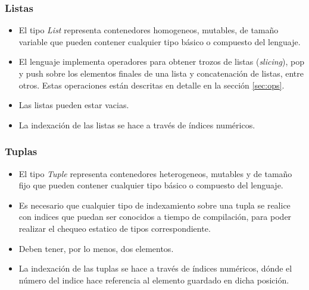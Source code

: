 \documentclass[12pt, spanish]{report}
\begin{document}
\subsubsection{Listas}
\label{sec:lists}
\begin{itemize}
\item El tipo \emph{List} representa contenedores homogeneos,
  mutables, de tama\~no variable que pueden contener cualquier tipo
  b\'asico o compuesto del lenguaje.
\item El lenguaje implementa operadores para obtener trozos de listas
  (\emph{slicing}), pop y push sobre los elementos finales de una
  lista y concatenaci\'on de listas, entre otros. Estas operaciones
  est\'an descritas en detalle en la secci\'on \ref{sec:ops}.
\item Las listas pueden estar vacias.
\item La indexaci\'on de las listas se hace a trav\'es de \'indices
  num\'ericos.
\end{itemize}

\subsubsection{Tuplas}
\label{sec:tuples}
\begin{itemize}
\item El tipo \emph{Tuple} representa contenedores heterogeneos,
  mutables y de tama\~no fijo que pueden contener cualquier tipo
  b\'asico o compuesto del lenguaje.
\item Es necesario que cualquier tipo de indexamiento sobre una tupla
  se realice con indices que puedan ser conocidos a tiempo de
  compilaci\'on, para poder realizar el chequeo estatico de tipos
  correspondiente.
\item Deben tener, por lo menos, dos elementos.
\item La indexaci\'on de las tuplas se hace a trav\'es de \'indices
  num\'ericos, d\'onde el n\'umero del indice hace referencia al elemento
  guardado en dicha posici\'on.
\end{itemize}
\end{document}
